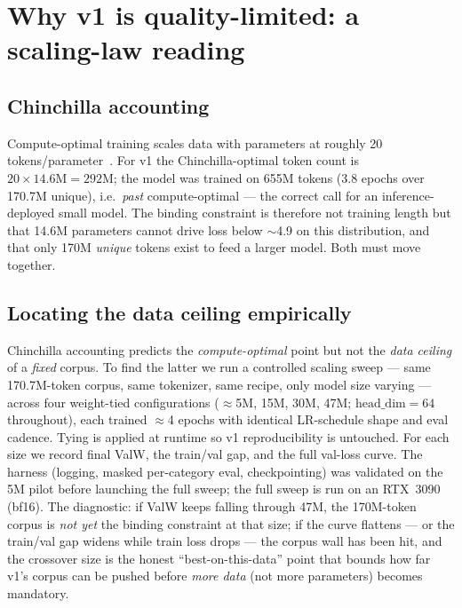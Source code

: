 \documentclass[10pt,twocolumn]{article}
\begin{document}
\section{Why v1 is quality-limited: a scaling-law reading}

\subsection{Chinchilla accounting}
Compute-optimal training scales data with parameters at roughly 20
tokens/parameter~\cite{kaplan,chinchilla}. For v1 the Chinchilla-optimal token
count is $20\times14.6\text{M}=292$M; the model was trained on 655M tokens
(3.8 epochs over 170.7M unique), i.e.\ \emph{past} compute-optimal --- the
correct call for an inference-deployed small model. The binding constraint is
therefore not training length but that 14.6M parameters cannot drive loss below
$\sim$4.9 on this distribution, and that only 170M \emph{unique} tokens exist to
feed a larger model. Both must move together.

\subsection{Locating the data ceiling empirically}
\label{sec:ceiling}
Chinchilla accounting predicts the \emph{compute-optimal} point but not the
\emph{data ceiling} of a \emph{fixed} corpus. To find the latter we run a controlled
scaling sweep --- same 170.7M-token corpus, same tokenizer, same recipe, only model
size varying --- across four weight-tied configurations ($\approx$5M, 15M, 30M, 47M;
$\text{head\_dim}{=}64$ throughout), each trained $\approx$4 epochs with identical
LR-schedule shape and eval cadence. Tying is applied at runtime so v1 reproducibility
is untouched. For each size we record final ValW, the train/val gap, and the
full val-loss curve. The harness (logging, masked per-category eval, checkpointing)
was validated on the 5M pilot before launching the full sweep; the full sweep is run on
an RTX~3090 (bf16). The diagnostic: if ValW keeps falling through 47M, the 170M-token
corpus is \emph{not yet} the binding constraint at that size; if the curve flattens ---
or the train/val gap widens while train loss drops --- the corpus wall has been hit, and
the crossover size is the honest ``best-on-this-data'' point that bounds how far v1's
corpus can be pushed before \emph{more data} (not more parameters) becomes mandatory.
\end{document}
